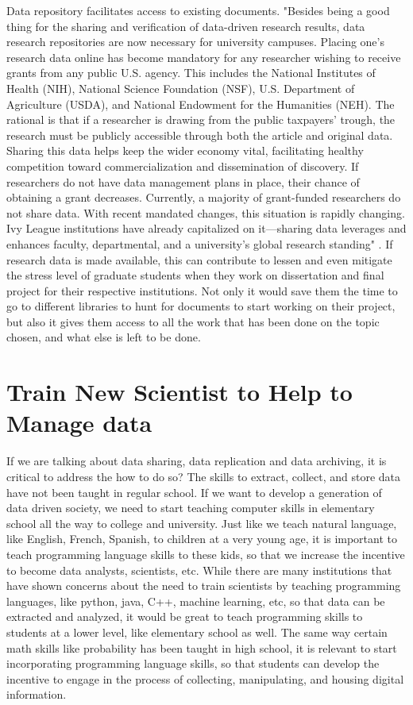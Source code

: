 \documentclass[sigconf]{acmart}
\begin{document}
Data repository facilitates access to existing documents. "Besides being a good thing for the sharing and verification of data-driven research results, data research repositories are now necessary for university campuses. Placing one’s research data online has become mandatory for any researcher wishing to receive grants from any public U.S. agency. This includes the National Institutes of Health (NIH), National Science Foundation (NSF), U.S. Department of Agriculture (USDA), and National Endowment for the Humanities (NEH). The rational is that if a researcher is drawing from the public taxpayers’ trough, the research must be publicly accessible through both the article and original data. Sharing this data helps keep the wider economy vital, facilitating healthy competition toward commercialization and dissemination of discovery. If researchers do not have data management plans in place, their chance of obtaining a grant decreases. Currently, a majority of grant-funded researchers do not share data. With recent mandated changes, this situation is rapidly changing. Ivy League institutions have already capitalized on it—sharing data leverages and enhances faculty, departmental, and a university’s global research standing" \cite{Uswyshyn2016}. If research data is made available, this can contribute to lessen and even mitigate the stress level of graduate students when they work on dissertation and final project for their respective institutions. Not only it would save them the time to go to different libraries to hunt for documents to start working on their project, but also it gives them access to all the work that has been done on the topic chosen, and what else is left to be done.  

\section{Train New Scientist to Help to Manage data}

If we are talking about data sharing, data replication and data archiving, it is critical to address the how to do so? The skills to extract, collect, and store data have not been taught in regular school. If we want to develop a generation of data driven society, we need to start teaching computer skills in elementary school all the way to college and university. Just like we teach natural language, like English, French, Spanish, to children at a very young age, it is important to teach programming language skills to these kids, so that we increase the incentive to become data analysts, scientists, etc. While there are many institutions that have shown concerns about the need to train scientists by teaching programming languages, like python, java, C++, machine learning, etc,  so that data can be extracted and analyzed, it would be great to teach programming skills to students at a lower level, like elementary school as well. The same way certain math skills like probability has been taught in high school, it is relevant to start incorporating programming language skills, so that students can develop the incentive to engage in the process of collecting, manipulating, and housing digital information.
\end{document}
